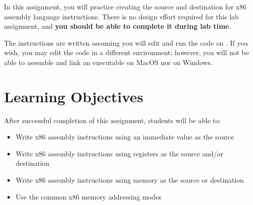 



\renewcommand{\labnumber}{\addressinglabnumber}
\renewcommand{\labname}{x86 Addressing Modes Lab}
\renewcommand{\shortlabname}{addressinglab}
\renewcommand{\collaborationrules}{\addressinglabcollaboration}
\renewcommand{\duedate}{\addressinglabdue}
\pagelayout

\labidentifier




In this assignment, you will practice creating the source and destination for
x86 assembly language instructions. There is no design effort required for this
lab assignment, and \textbf{you should be able to complete it during lab time}.

The instructions are written assuming you will edit and run the code on
\runtimeenvironment. If you wish, you may edit the code in a different
environment; however, you will not be able to assemble and link an executable
on MacOS nor on Windows.

\section*{Learning Objectives}

After successful completion of this assignment, students will be able to:
\begin{itemize}
\item Write x86 assembly instructions using an immediate value as the source
\item Write x86 assembly instructions using registers as the source and/or
    destination
\item Write x86 assembly instructions using memory as the source or destination
\item Use the common x86 memory addressing modes
\end{itemize}

